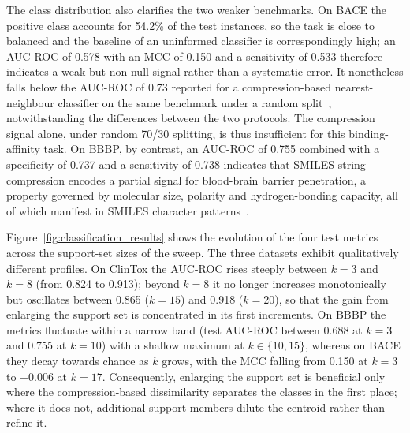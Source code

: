 The class distribution also clarifies the two weaker benchmarks. On BACE the
positive class accounts for 54.2\% of the test instances, so the task is close to
balanced and the baseline of an uninformed classifier is correspondingly high;
an AUC-ROC of 0.578 with an MCC of 0.150 and a sensitivity of 0.533 therefore
indicates a weak but non-null signal rather than a systematic error. It
nonetheless falls below the AUC-ROC of 0.73 reported for a compression-based
nearest-neighbour classifier on the same benchmark under a random
split~\cite{weinreich2025learning}, notwithstanding the differences between the
two protocols. The compression signal alone, under random 70/30 splitting, is
thus insufficient for this binding-affinity task. On BBBP, by
contrast, an AUC-ROC of 0.755 combined with a specificity of 0.737 and a
sensitivity of 0.738 indicates that SMILES string compression encodes a partial
signal for blood-brain barrier penetration, a property governed by molecular
size, polarity and hydrogen-bonding capacity, all of which manifest in SMILES
character patterns~\cite{martins2012bayesian}.

Figure~\ref{fig:classification_results} shows the evolution of the four test
metrics across the support-set sizes of the sweep. The three datasets exhibit
qualitatively different profiles. On ClinTox the AUC-ROC rises steeply between
$k=3$ and $k=8$ (from 0.824 to 0.913); beyond $k=8$ it no longer increases
monotonically but oscillates between 0.865 ($k=15$) and 0.918 ($k=20$), so that
the gain from enlarging the support set is concentrated in its first
increments. On BBBP the metrics fluctuate within a narrow band (test AUC-ROC
between 0.688 at $k=3$ and 0.755 at $k=10$) with a shallow maximum at
$k\in\{10,15\}$, whereas on BACE they decay towards chance as
$k$ grows, with the MCC falling from 0.150 at $k=3$ to $-0.006$ at $k=17$.
Consequently, enlarging the support set is beneficial only where the
compression-based dissimilarity separates the classes in the first place; where
it does not, additional support members dilute the centroid rather than refine
it.

